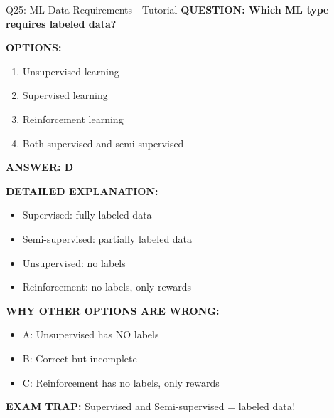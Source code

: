 \documentclass[8pt]{beamer}
\begin{document}
	\begin{frame}{Q25: ML Data Requirements - Tutorial}
		\fontsize{6.5}{7.5}\selectfont
		\textbf{QUESTION: Which ML type requires labeled data?}
		
		\vspace{0.1cm}
		\textbf{OPTIONS:}
		\begin{enumerate}
			\item Unsupervised learning
			\item Supervised learning
			\item Reinforcement learning
			\item Both supervised and semi-supervised
		\end{enumerate}
		
		\vspace{0.1cm}
		\textcolor{myblue}{\textbf{ANSWER: D}}
		
		\vspace{0.1cm}
		\textbf{DETAILED EXPLANATION:}
		\begin{itemize}
			\item Supervised: fully labeled data
			\item Semi-supervised: partially labeled data
			\item Unsupervised: no labels
			\item Reinforcement: no labels, only rewards
		\end{itemize}
		
		\vspace{0.1cm}
		\textcolor{myred}{\textbf{WHY OTHER OPTIONS ARE WRONG:}}
		\begin{itemize}
			\item \textcolor{myred}{A:} Unsupervised has NO labels
			\item \textcolor{myred}{B:} Correct but incomplete
			\item \textcolor{myred}{C:} Reinforcement has no labels, only rewards
		\end{itemize}
		
		\textcolor{myred}{\textbf{EXAM TRAP:}} Supervised and Semi-supervised = \textcolor{myblue}{labeled data}!
	\end{frame}
	
	
\end{document}
